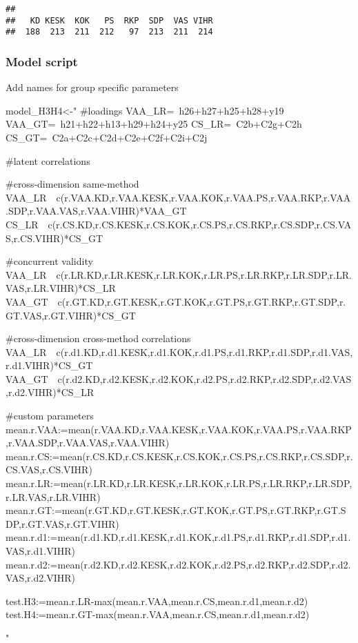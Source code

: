 \documentclass[
]{article}
\newenvironment{Shaded}{\begin{snugshade}}{\end{snugshade}}
\newcommand{\NormalTok}[1]{#1}
\newcommand{\StringTok}[1]{\textcolor[rgb]{0.31,0.60,0.02}{#1}}
\begin{document}
\begin{verbatim}
## 
##   KD KESK  KOK   PS  RKP  SDP  VAS VIHR 
##  188  213  211  212   97  213  211  214
\end{verbatim}

\hypertarget{model-script-1}{%
\subsubsection{Model script}\label{model-script-1}}

Add names for group specific parameters

\begin{Shaded}
\begin{Highlighting}[]
\NormalTok{model_H3H4<-}\StringTok{"}
\StringTok{#loadings}
\StringTok{VAA_LR=~h26+h27+h25+h28+y19}
\StringTok{VAA_GT=~h21+h22+h13+h29+h24+y25}
\StringTok{CS_LR=~C2b+C2g+C2h}
\StringTok{CS_GT=~C2a+C2c+C2d+C2e+C2f+C2i+C2j}

\StringTok{#latent correlations}

\StringTok{#cross-dimension same-method}
\StringTok{VAA_LR~~c(r.VAA.KD,r.VAA.KESK,r.VAA.KOK,r.VAA.PS,r.VAA.RKP,r.VAA.SDP,r.VAA.VAS,r.VAA.VIHR)*VAA_GT}
\StringTok{CS_LR~~c(r.CS.KD,r.CS.KESK,r.CS.KOK,r.CS.PS,r.CS.RKP,r.CS.SDP,r.CS.VAS,r.CS.VIHR)*CS_GT}

\StringTok{#concurrent validity}
\StringTok{VAA_LR~~c(r.LR.KD,r.LR.KESK,r.LR.KOK,r.LR.PS,r.LR.RKP,r.LR.SDP,r.LR.VAS,r.LR.VIHR)*CS_LR}
\StringTok{VAA_GT~~c(r.GT.KD,r.GT.KESK,r.GT.KOK,r.GT.PS,r.GT.RKP,r.GT.SDP,r.GT.VAS,r.GT.VIHR)*CS_GT}

\StringTok{#cross-dimension cross-method correlations}
\StringTok{VAA_LR~~c(r.d1.KD,r.d1.KESK,r.d1.KOK,r.d1.PS,r.d1.RKP,r.d1.SDP,r.d1.VAS,r.d1.VIHR)*CS_GT}
\StringTok{VAA_GT~~c(r.d2.KD,r.d2.KESK,r.d2.KOK,r.d2.PS,r.d2.RKP,r.d2.SDP,r.d2.VAS,r.d2.VIHR)*CS_LR}

\StringTok{#custom parameters}
\StringTok{mean.r.VAA:=mean(r.VAA.KD,r.VAA.KESK,r.VAA.KOK,r.VAA.PS,r.VAA.RKP,r.VAA.SDP,r.VAA.VAS,r.VAA.VIHR)}
\StringTok{mean.r.CS:=mean(r.CS.KD,r.CS.KESK,r.CS.KOK,r.CS.PS,r.CS.RKP,r.CS.SDP,r.CS.VAS,r.CS.VIHR)}
\StringTok{mean.r.LR:=mean(r.LR.KD,r.LR.KESK,r.LR.KOK,r.LR.PS,r.LR.RKP,r.LR.SDP,r.LR.VAS,r.LR.VIHR)}
\StringTok{mean.r.GT:=mean(r.GT.KD,r.GT.KESK,r.GT.KOK,r.GT.PS,r.GT.RKP,r.GT.SDP,r.GT.VAS,r.GT.VIHR)}
\StringTok{mean.r.d1:=mean(r.d1.KD,r.d1.KESK,r.d1.KOK,r.d1.PS,r.d1.RKP,r.d1.SDP,r.d1.VAS,r.d1.VIHR)}
\StringTok{mean.r.d2:=mean(r.d2.KD,r.d2.KESK,r.d2.KOK,r.d2.PS,r.d2.RKP,r.d2.SDP,r.d2.VAS,r.d2.VIHR)}

\StringTok{test.H3:=mean.r.LR-max(mean.r.VAA,mean.r.CS,mean.r.d1,mean.r.d2)}
\StringTok{test.H4:=mean.r.GT-max(mean.r.VAA,mean.r.CS,mean.r.d1,mean.r.d2)}

\StringTok{"}
\end{Highlighting}
\end{Shaded}
\end{document}
